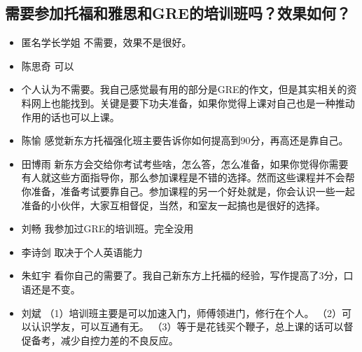 \documentclass{vivid_layout}
\begin{document}
\subsection{需要参加托福和雅思和GRE的培训班吗？效果如何？}
\begin{itemize}
\item  {\name 匿名学长学姐}  \quad 不需要，效果不是很好。
\item { 陈思奇} \quad 可以
\item 个人认为不需要。我自己感觉最有用的部分是GRE的作文，但是其实相关的资料网上也能找到。关键是要下功夫准备，如果你觉得上课对自己也是一种推动作用的话也可以上课。
\item  { 陈愉}  \quad 感觉新东方托福强化班主要告诉你如何提高到90分，再高还是靠自己。
\item  { 田博雨}  \quad 新东方会交给你考试考些啥，怎么答，怎么准备，如果你觉得你需要有人就这些方面指导你，那么参加课程是不错的选择。然而这些课程并不会帮你准备，准备考试要靠自己。参加课程的另一个好处就是，你会认识一些一起准备的小伙伴，大家互相督促，当然，和室友一起搞也是很好的选择。
\item  { 刘畅}  \quad 我参加过GRE的培训班。完全没用
\item  { 李诗剑}  \quad 取决于个人英语能力
\item  { 朱虹宇}  \quad 看你自己的需要了。我自己新东方上托福的经验，写作提高了3分，口语还是不变。
\item  { 刘斌}  \quad （1）培训班主要是可以加速入门，师傅领进门，修行在个人。
  （2）可以认识学友，可以互通有无。
    （3）等于是花钱买个鞭子，总上课的话可以督促备考，减少自控力差的不良反应。
\end{itemize}
\end{document}
